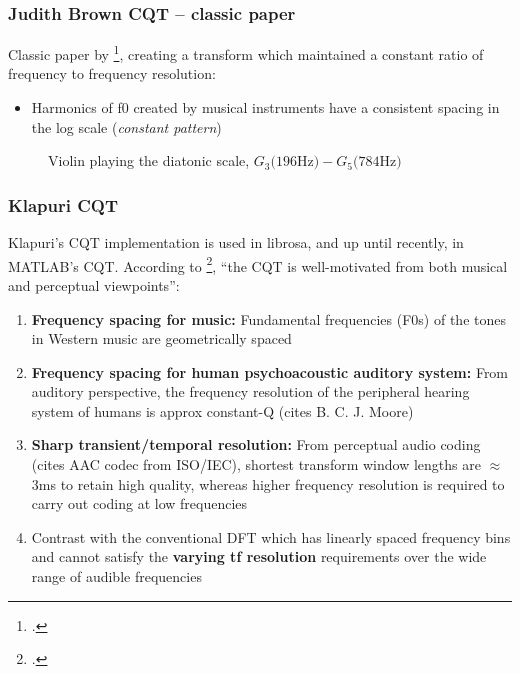 \documentclass[usenames,dvipsnames]{beamer}
\begin{document}
\begin{frame}
	\frametitle{Judith Brown CQT -- classic paper}
	Classic paper by \footcite{jbrown}, creating a transform which maintained a constant ratio of frequency to frequency resolution:
\begin{itemize}
	\item
		Harmonics of f0 created by musical instruments have a consistent spacing in the log scale (\textit{constant pattern})
	\end{itemize}
	\begin{figure}[ht]
		\vspace{-0.75em}
		\centering
		\hspace{0.5em}
		\caption{Violin playing the diatonic scale, $G_{3} \text{(196Hz)} - G_{5} \text{(784Hz)}$}
	\end{figure}
\end{frame}

\begin{frame}
	\frametitle{Klapuri CQT}
	Klapuri's CQT implementation is used in librosa, and up until recently, in MATLAB's CQT. According to \footcite{cqtklapuri}, ``the CQT is well-motivated from both musical and perceptual viewpoints'':
	\begin{enumerate}
		\item
			\textbf{Frequency spacing for music:} Fundamental frequencies (F0s) of the tones in Western music are geometrically spaced
		 \item
			 \textbf{Frequency spacing for human psychoacoustic auditory system:} From auditory perspective, the frequency resolution of the peripheral hearing system of humans is approx constant-Q (cites B. C. J. Moore)
		 \item
			 \textbf{Sharp transient/temporal resolution:} From perceptual audio coding (cites AAC codec from ISO/IEC), shortest transform window lengths are $\approx$ 3ms to retain high quality, whereas higher frequency resolution is required to carry out coding at low frequencies
		\item
			Contrast with the conventional DFT which has linearly spaced frequency bins and cannot satisfy the \textbf{varying tf resolution} requirements over the wide range of audible frequencies
	\end{enumerate}
\end{frame}
\end{document}
